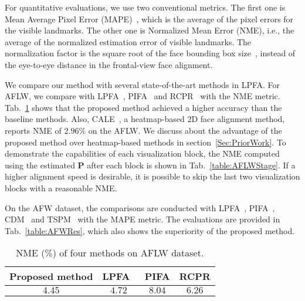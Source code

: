 For quantitative evaluations, we use two conventional metrics. 
The first one is Mean Average Pixel Error (MAPE)~\cite{yu2013pose}, which is the average of the pixel errors for the visible landmarks. The other one is Normalized Mean Error (NME), i.e., the average of the normalized estimation error of visible landmarks.
The normalization factor is the square root of the face bounding box size~\cite{jourabloo2015pose}, instead of the eye-to-eye distance in the frontal-view face alignment.


We compare our method with several state-of-the-art methods in LPFA. 
For AFLW, we compare with LPFA~\cite{jourabloo2016large}, PIFA~\cite{jourabloo2015pose} and RCPR~\cite{burgos2013robust} with the NME metric. 
Tab.~\ref{table:AFLWRes} shows that the proposed method achieved a higher accuracy than the baseline methods. Also, CALE~\cite{bulat2016convolutional}, a heatmap-based $2$D face alignment method, reports NME of $2.96\%$ on the AFLW. We discuss about the advantage of the proposed method over heatmap-based methods in section~\ref{Sec:PriorWork}.
To demonstrate the capabilities of each visualization block, the NME computed using the estimated $\mathbf{P}$ after each block is shown in Tab.~\ref{table:AFLWStage}. 
If a higher alignment speed is desirable, it is possible to skip the last two visualization blocks with a reasonable NME.





On the AFW dataset, the comparisons are conducted with LPFA~\cite{jourabloo2016large}, PIFA~\cite{jourabloo2015pose}, CDM~\cite{yu2013pose} and TSPM~\cite{zhu2012face} with the MAPE metric. 
The evaluations are provided in Tab.~\ref{table:AFWRes}, which also shows the superiority of the proposed method.



\begin{table}[t!]\small
\caption{NME ($\%$) of four methods on AFLW dataset.}
\begin{center}
\begin{tabular}{ c|c|c|c } 
 \hline
 Proposed method & LPFA~\cite{jourabloo2016large} & PIFA & RCPR \\ 
 \hline
 $4.45$ & $4.72$ & $8.04$ & $6.26$ \\
 \hline  
\end{tabular}
\end{center}
\label{table:AFLWRes}\vspace{-7mm}
\end{table}





